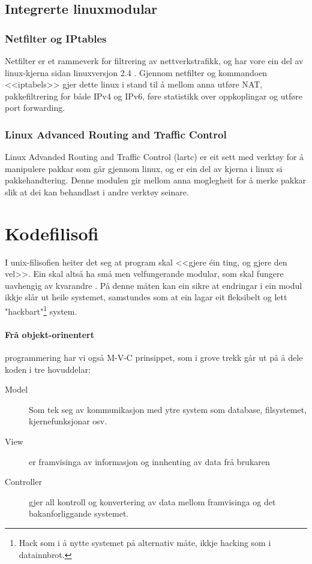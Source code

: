 \documentclass[nynorsk,12pt,a4paper,oneside]{book}
\begin{document}
\subsection{Integrerte linuxmodular}
\subsubsection{Netfilter og IPtables}
Netfilter er et rammeverk for filtrering av nettverkstrafikk, og har vore ein del av linux-kjerna sidan linuxversjon 2.4 \cite{netfiltercore}. Gjennom netfilter og kommandoen <<iptabels>> gjer dette linux i stand til å mellom anna utføre NAT, pakkefiltrering for både IPv4 og IPv6, føre statistikk over oppkoplingar og utføre port forwarding. 

\subsubsection{Linux Advanced Routing and Traffic Control}
Linux Advanded Routing and Traffic Control (lartc) er eit sett med verktøy for å manipulere pakkar som går gjennom linux, og er ein del av kjerna i linux si pakkehandtering. \cite{lartcintro} Denne modulen gir mellom anna moglegheit for å merke pakkar slik at dei kan behandlast i andre verktøy seinare. 


\section{Kodefilisofi}
I unix-filisofien heiter det seg at program skal <<gjere éin ting, og gjere den vel>>. Ein skal altså ha små men velfungerande modular, som skal fungere uavhengig av kvarandre \cite{unixprog}. På denne måten kan ein sikre at endringar i ein modul ikkje slår ut heile systemet, samstundes som at ein lagar eit fleksibelt og lett "hackbart"\footnote{Hack som i å nytte systemet på alternativ måte, ikkje hacking som i datainnbrot.} system. 

\paragraph{Frå objekt-orinentert} programmering har vi også M-V-C prinsippet, som i grove trekk går ut på å dele koden i tre hovuddelar: \cite{mvc}

\begin{description}
	\item[Model] Som tek seg av kommunikasjon med ytre system som database, filsystemet, kjernefunksjonar osv.
	\item[View] er framvisinga av informasjon og innhenting av data frå brukaren
	\item[Controller] gjer all kontroll og konvertering av data mellom framvisinga og det bakanforliggande systemet.
\end{description}
\end{document}
